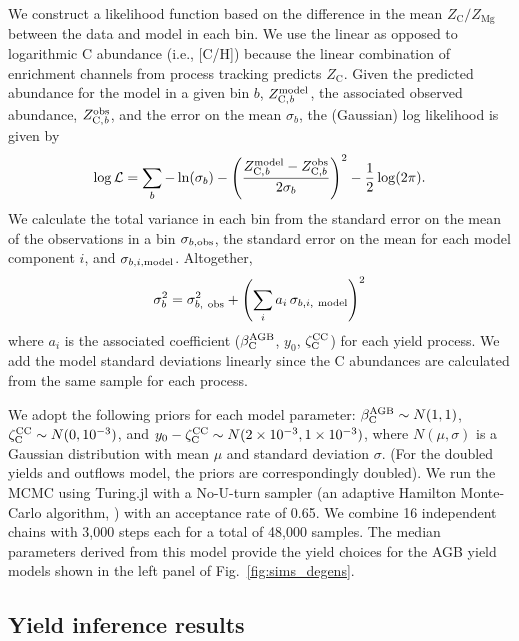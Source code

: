 \documentclass[fleqn,
usenatbib]{mnras}
\newcommand{\aagb}{\beta_{\rm C}^{\rm AGB}}
\newcommand{\yo}{y_0}
\newcommand{\zcc}{\zeta_{\rm C}^{\rm CC}}
\begin{document}
{We construct a likelihood function based on the difference in the mean $Z_\text{C}/Z_\text{Mg}$ between the data and model in each bin. 
We use the linear as opposed to logarithmic C abundance (i.e., [C/H]) because the linear combination of enrichment channels from process tracking predicts $Z_\text{C}$. 
Given the predicted abundance for the model in a given bin $b$,  $Z_{\rm C, \it b}^{\rm model}$, the associated observed abundance, $Z_{\rm C, \it b}^{\rm obs}$, and the error on the mean $\sigma_b$, the (Gaussian) log likelihood is given by
\begin{equation} \label{eq:mcmc_likelihood}
    \log {\cal L} = \sum_b -\ln(\sigma_{b}) -\left(\frac{Z_{\rm C, \it b}^{\rm model} - Z_{{\rm C}, b}^{\rm obs}}{2\sigma_{b}}\right)^2 - \frac{1}{2}\log(2\pi).
\end{equation}
We calculate the total variance in each bin from the standard error on the mean of the observations in a bin $\sigma_{b, \rm obs}$, the standard error on the mean for each model component $i$, and $\sigma_{b, i,\rm model}$. Altogether, 
\begin{equation}
    \sigma_{b}^2 = \sigma_{b,\rm\ obs}^2  +  \left(\sum_{i} a_i\, \sigma_{b,i,\ \rm model}\right)^2
\end{equation}
where $a_i$ is the associated coefficient ($\aagb$, $\yo$, $\zcc$) for each yield process.
We add the model standard deviations linearly since the C abundances are calculated from the same sample for each process.


We adopt the following priors for each model parameter: $\aagb \sim N(1, 1)$, $\zcc \sim N(0, 10^{-3})$, and $\yo-\zcc \sim N(2\times10^{-3}, 1\times10^{-3})$, where $N(\mu, \sigma)$ is a Gaussian distribution with mean $\mu$ and standard deviation $\sigma$. (For the doubled yields and outflows model, the priors are correspondingly doubled). 
We run the MCMC using Turing.jl \citep{turingjl} with a No-U-turn sampler (an adaptive Hamilton Monte-Carlo algorithm, \citealt{NUTS}) with an acceptance rate of 0.65. We combine 16 independent chains with 3,000 steps each for a total of 48,000 samples.
The median parameters derived from this model provide the yield choices for the AGB yield models shown in the left panel of Fig.~\ref{fig:sims_degens}.


\subsection{Yield inference results} \label{sec:mcmc_results}


}
\end{document}
